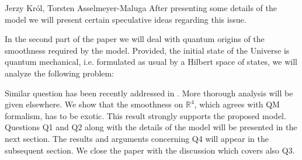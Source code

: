 \begin{artengenv2auth}{Jerzy Kr\'ol, Torsten Asselmeyer-Maluga}
After presenting some details of the model we will present certain speculative ideas regarding this issue.

In the second part of the paper we will deal with quantum origins of the smoothness required by the model. Provided, the initial state of the Universe is quantum mechanical, i.e. formulated as usual by a Hilbert space of states, we will analyze the following problem:


Similar question has been recently addressed in \parencite{JKuniverse17,JK2017a}. More thorough analysis will be given elsewhere. We show that the smoothness on $\mathbb{R}^4$, which agrees with QM formalism, has to be exotic. This result strongly supports the proposed model. Questions Q1 and Q2 along with the details of the model will be presented in the next section. The results and arguments concerning Q4 will appear in the subsequent section. We close the paper with the discussion which covers also Q3.


\end{artengenv2auth}
